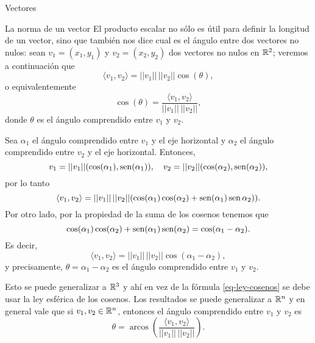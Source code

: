 \begin{chapter}{Vectores}
\begin{section}{La norma de un vector}
El producto escalar no sólo es útil para definir la longitud de un vector,  sino que también nos dice cual es el ángulo entre dos vectores no nulos: sean   $v_1= (x_1,y_1)$ y $v_2= (x_2,y_2)$ dos vectores no nulos en $\mathbb R^2$; veremos a continuación que 
        \begin{equation*}
        \langle v_1 , v_2 \rangle = ||v_1||\, ||v_2|| \cos(\theta),
        \end{equation*}
        o equivalentemente
        \begin{equation}\label{eq-cos-theta}
            \cos(\theta) = \frac{\langle v_1 , v_2 \rangle}{||v_1||\, ||v_2||} ,
            \end{equation} 
        donde  $\theta$ es el ángulo comprendido entre $v_1$ y $v_2$.
    
        
        Sea $\alpha_1$ el ángulo comprendido  entre $v_1$ y el eje horizontal y $\alpha_2$ el ángulo comprendido  entre $v_2$ y el eje horizontal.  Entonces,
        \begin{equation*}
        v_1 = ||v_1||(\cos (\alpha_1), \operatorname{sen}(\alpha_1) ), \quad v_2 = ||v_2||(\cos (\alpha_2), \operatorname{sen}(\alpha_2) ),
        \end{equation*}
        por lo tanto
        \begin{equation*}
        \langle v_1 , v_2 \rangle =  ||v_1|| \,  ||v_2|| (\cos (\alpha_1)\cos(\alpha_2)+  \operatorname{sen}(\alpha_1)\operatorname{sen}\alpha_2)). 
        \end{equation*}
        Por otro  lado, por la propiedad de la suma de los cosenos tenemos que 
        \begin{equation}\label{eq-ley-cosenos}
        \cos (\alpha_1)\cos(\alpha_2)+  \operatorname{sen}(\alpha_1)\operatorname{sen}(\alpha_2) = \cos(\alpha_1- \alpha_2).
        \end{equation}
        Es decir, 
        \begin{equation}
        \langle v_1,v_2 \rangle =   ||v_1|| \,  ||v_2|| \cos (\alpha_1-\alpha_2), 
        \end{equation}
        y precisamente, $\theta =  \alpha_1-\alpha_2$ es el ángulo comprendido entre  $v_1$ y $v_2$.
        
        Esto se puede generalizar a $\mathbb R^3$  y ahí en vez de la fórmula \eqref{eq-ley-cosenos} se debe usar la ley esférica de los cosenos. Los resultados se puede generalizar a  $\mathbb R^n$ y  en general vale  que si $v_1, v_2 \in \mathbb R^n$,  entonces el ángulo comprendido entre $v_1$ y $v_2$ es 
        \begin{equation}\label{eq-ang-comprendido}
        \theta = 	\operatorname{arcos}\left(\frac{\langle v_1 , v_2 \rangle}{||v_1|| \,  ||v_2|| }\right).
        \end{equation}  
        

\end{section}
\end{chapter}
